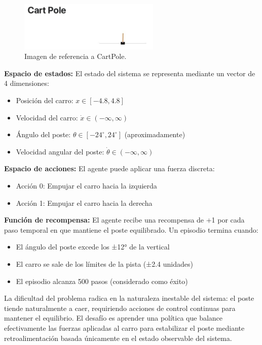 \documentclass[12pt,a4paper]{article}
\begin{document}
\begin{figure}[H]
  \centering
  \includegraphics[width=0.6\textwidth]{img/cartPole.jpeg}
  \caption{Imagen de referencia a CartPole.}
\end{figure}

\textbf{Espacio de estados:} El estado del sistema se representa mediante un vector de 4 dimensiones:


\begin{itemize}
    \item Posición del carro: $x \in [-4.8, 4.8]$
    \item Velocidad del carro: $\dot{x} \in (-\infty, \infty)$
    \item Ángulo del poste: $\theta \in [-24^\circ, 24^\circ]$ (aproximadamente)
    \item Velocidad angular del poste: $\dot{\theta} \in (-\infty, \infty)$
\end{itemize}


\textbf{Espacio de acciones:} El agente puede aplicar una fuerza discreta:
\begin{itemize}
\item Acción 0: Empujar el carro hacia la izquierda
\item Acción 1: Empujar el carro hacia la derecha
\end{itemize}
\textbf{Función de recompensa:} El agente recibe una recompensa de +1 por cada paso temporal en que mantiene el poste equilibrado. Un episodio termina cuando:
\begin{itemize}
\item El ángulo del poste excede los ±12° de la vertical
\item El carro se sale de los límites de la pista (±2.4 unidades)
\item El episodio alcanza 500 pasos (considerado como éxito)
\end{itemize}
La dificultad del problema radica en la naturaleza inestable del sistema: el poste tiende naturalmente a caer, requiriendo acciones de control continuas para mantener el equilibrio. El desafío es aprender una política que balance efectivamente las fuerzas aplicadas al carro para estabilizar el poste mediante retroalimentación basada únicamente en el estado observable del sistema.
\end{document}
